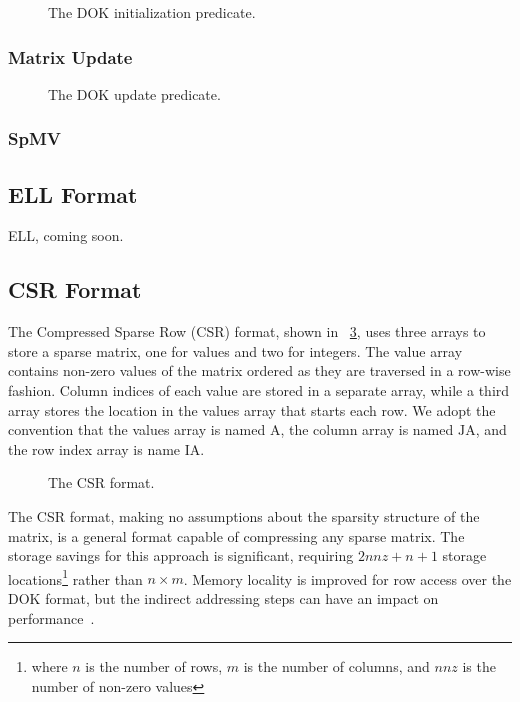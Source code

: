 \begin{figure}
\centering

\caption{The DOK initialization predicate.}
\label{init:dok}
\end{figure}

\subsubsection{Matrix Update}

\begin{figure}
\centering

\caption{The DOK update predicate.}
\label{update:dok}
\end{figure}

\subsubsection{SpMV}

\subsection{ELL Format}

ELL, coming soon.

\subsection{CSR Format}

The Compressed Sparse Row (CSR) format, shown in \figurename~\ref{image:csr}, uses three arrays to store a sparse matrix, one for values and two for integers.  The value array contains non-zero values of the matrix ordered as they are traversed in a row-wise fashion.  Column indices of each value are stored in a separate array, while a third array stores the location in the values array that starts each row.  We adopt the convention that the values array is named $\mathrm{A}$, the column array is named $\mathrm{JA}$, and the row index array is name $\mathrm{IA}$.

\begin{figure}
\centering

\caption{The CSR format.}
\label{image:csr}
\end{figure}

The CSR format, making no assumptions about the sparsity structure of the matrix, is a general format capable of compressing any sparse matrix.  The storage savings for this approach is significant, requiring $2nnz+n+1$ storage locations\footnote{where $n$ is the number of rows, $m$ is the number of columns, and $nnz$ is the number of non-zero values} rather than $n \times m$.  Memory locality is improved for row access over the DOK format, but the indirect addressing steps can have an impact on performance~\cite{bai}.

